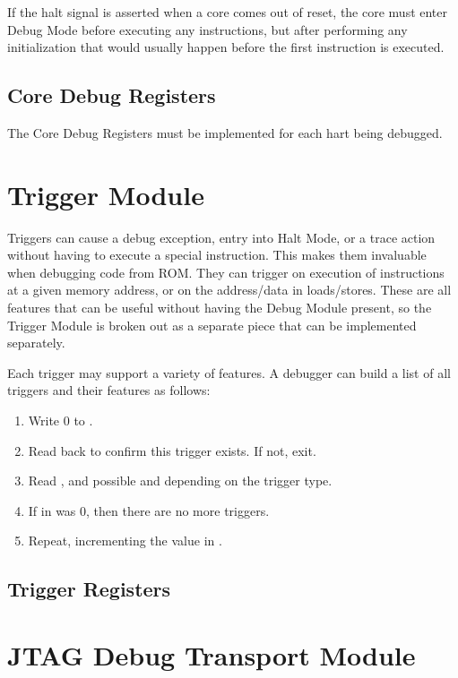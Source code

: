 \documentclass{article}
\newenvironment{steps}[1]
{
   \vspace{1ex}
   \noindent
   #1
   \begin{enumerate}[nosep]
}
{
   \end{enumerate}
   \vspace{1ex}
}
\begin{document}
If the halt signal is asserted when a core comes out of reset, the core must
enter Debug Mode before executing any instructions, but after performing any
initialization that would usually happen before the first instruction is
executed.

\subsection{Core Debug Registers} \label{debreg}

The Core Debug Registers must be implemented for each hart being debugged.



\section{Trigger Module}

Triggers can cause a debug exception, entry into Halt Mode, or a trace action
without having to execute a special instruction. This makes them invaluable
when debugging code from ROM. They can trigger on execution of instructions at
a given memory address, or on the address/data in loads/stores.  These are all
features that can be useful without having the Debug Module present, so the
Trigger Module is broken out as a separate piece that can be implemented
separately.

\begin{steps}{Each trigger may support a variety of features. A debugger can
    build a list of all triggers and their features as follows:}
\item Write 0 to \Rtselect.
\item Read back \Rtselect to confirm this trigger exists. If not, exit.
\item Read \Rtdataone, and possible \Rtdatatwo and \Rtdatathree depending on the
    trigger type.
\item If \Ftype in \Rtdataone was 0, then there are no more triggers.
\item Repeat, incrementing the value in \Rtselect.
\end{steps}

\subsection{Trigger Registers}



\section{JTAG Debug Transport Module} \label{jtagdtm}
\end{document}
